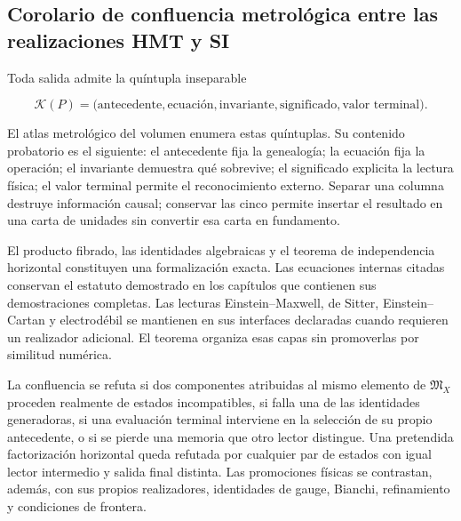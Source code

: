 \subsection{Corolario de confluencia metrológica entre las realizaciones HMT y SI}

Toda salida admite la qu\'intupla inseparable

\begin{equation}
 \mathcal K(P)=
 \bigl(
 \text{antecedente},
 \text{ecuaci\'on},
 \text{invariante},
 \text{significado},
 \text{valor terminal}
 \bigr).
 \label{rm:eq:confluence-quintuple}
\end{equation}

El atlas metrol\'ogico del volumen enumera estas qu\'intuplas.  Su contenido
probatorio es el siguiente: el antecedente fija la genealog\'ia; la ecuaci\'on
fija la operaci\'on; el invariante demuestra qu\'e sobrevive; el significado
explicita la lectura f\'isica; el valor terminal permite el reconocimiento
externo.  Separar una columna destruye informaci\'on causal; conservar las
cinco permite insertar el resultado en una carta de unidades sin convertir
esa carta en fundamento.

\begin{proofstatusbox}
El producto fibrado, las identidades algebraicas y el teorema de independencia
horizontal constituyen una formalizaci\'on exacta.  Las ecuaciones internas
citadas conservan el estatuto demostrado en los cap\'itulos que contienen sus demostraciones completas.  Las
lecturas Einstein--Maxwell, de Sitter, Einstein--Cartan y electrod\'ebil se
mantienen en sus interfaces declaradas cuando requieren un realizador
adicional.  El teorema organiza esas capas sin promoverlas por similitud
num\'erica.
\end{proofstatusbox}

\begin{falsifierbox}
La confluencia se refuta si dos componentes atribuidas al mismo elemento de
\(\mathfrak M_X\) proceden realmente de estados incompatibles, si falla una
de las identidades generadoras, si una evaluaci\'on terminal interviene en la
selecci\'on de su propio antecedente, o si se pierde una memoria que otro
lector distingue.  Una pretendida factorizaci\'on horizontal queda refutada
por cualquier par de estados con igual lector intermedio y salida final
distinta.  Las promociones f\'isicas se contrastan, adem\'as, con sus propios
realizadores, identidades de gauge, Bianchi, refinamiento y condiciones de
frontera.
\end{falsifierbox}

